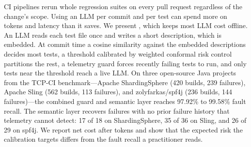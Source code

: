 CI pipelines rerun whole regression suites on every pull request regardless of the change's scope. Using an LLM per commit and per test can spend more on tokens and latency than it saves. We present \tool, which keeps most LLM cost offline. An LLM reads each test file once and writes a short description, which is embedded. At commit time a cosine similarity against the embedded descriptions decides most tests, a threshold calibrated by weighted conformal risk control partitions the rest, a telemetry guard forces recently failing tests to run, and only tests near the threshold reach a live LLM. On three open-source Java projects from the TCP-CI benchmark---Apache ShardingSphere (420 builds, 239 failures), Apache Sling (562 builds, 113 failures), and zolyfarkas/spf4j (236 builds, 144 failures)---the combined guard and semantic layer reaches 97.92\% to 99.58\% fault recall. The semantic layer recovers failures with no prior failure history that telemetry cannot detect: 17 of 18 on ShardingSphere, 35 of 36 on Sling, and 26 of 29 on spf4j. We report net cost after tokens and show that the expected risk the calibration targets differs from the fault recall a practitioner reads.

